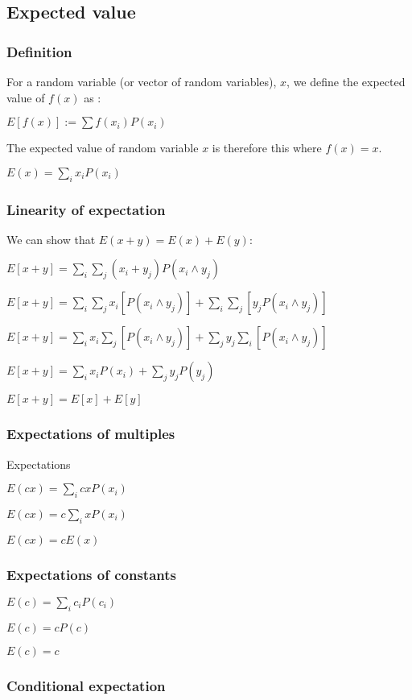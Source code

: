 
\subsection{Expected value}
\subsubsection{Definition}

For a random variable (or vector of random variables), \(x\), we define the expected value of \(f(x)\) as :

\(E[f(x)]:=\sum f(x_i) P(x_i)\)

The expected value of random variable \(x\) is therefore this where \(f(x)=x\).

\(E(x)=\sum_i x_i P(x_i)\)

\subsubsection{Linearity of expectation}

We can show that \(E(x+y)=E(x)+E(y)\):

\(E[x+y]=\sum_i \sum_j (x_i+y_j) P(x_i \land y_j)\)

\(E[x+y]=\sum_i \sum_j x_i [P(x_i \land y_j)]+\sum_i \sum_j [y_j P(x_i \land y_j)]\)

\(E[x+y]=\sum_i x_i \sum_j [P(x_i \land y_j)]+\sum_j y_j \sum_i [P(x_i \land y_j)]\)

\(E[x+y]=\sum_i x_i P(x_i)+\sum_j y_j P(y_j)\)

\(E[x+y]=E[x]+E[y]\)

\subsubsection{Expectations of multiples}

Expectations

\(E(cx)=\sum_i cx P(x_i)\)

\(E(cx)=c\sum_i x P(x_i)\)

\(E(cx)=cE(x)\)

\subsubsection{Expectations of constants}

\(E(c)=\sum_i c_i P(c_i)\)

\(E(c)= cP(c)\)

\(E(c)= c\)

\subsubsection{Conditional expectation}


